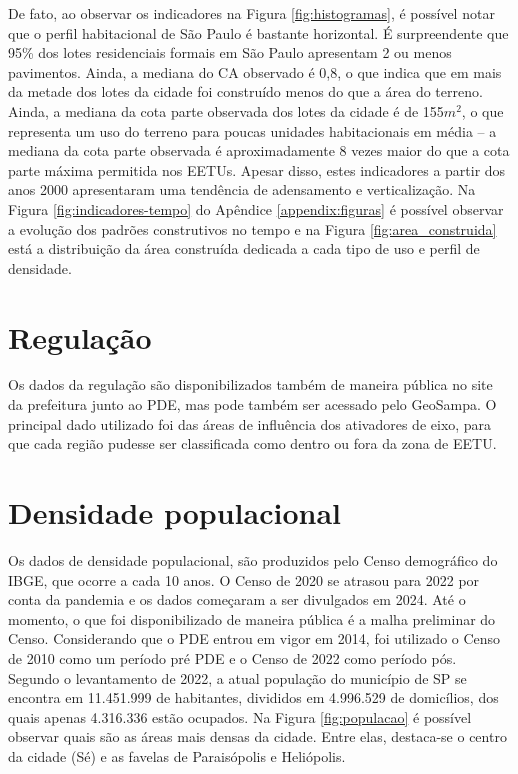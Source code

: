 De fato, ao observar os indicadores na Figura \ref{fig:histogramas}, é possível notar que o perfil habitacional de São Paulo é bastante horizontal. É surpreendente que 95\% dos lotes residenciais formais em São Paulo apresentam 2 ou menos pavimentos. Ainda, a mediana do CA observado é 0,8, o que indica que em mais da metade dos lotes da cidade foi construído menos do que a área do terreno. Ainda, a mediana da cota parte observada dos lotes da cidade é de 155$m^2$, o que representa um uso do terreno para poucas unidades habitacionais em média -- a mediana da cota parte observada é aproximadamente 8 vezes maior do que a cota parte máxima permitida nos EETUs. Apesar disso, estes indicadores a partir dos anos 2000 apresentaram uma tendência de adensamento e verticalização. Na Figura \ref{fig:indicadores-tempo} do Apêndice \ref{appendix:figuras} é possível observar a evolução dos padrões construtivos no tempo e na Figura \ref{fig:area_construida} está a distribuição da área construída dedicada a cada tipo de uso e perfil de densidade.

\section{Regulação}
\label{sec:dadosPDE}

Os dados da regulação são disponibilizados também de maneira pública no site da prefeitura junto ao PDE, mas pode também ser acessado pelo GeoSampa. O principal dado utilizado foi das áreas de influência dos ativadores de eixo, para que cada região pudesse ser classificada como dentro ou fora da zona de EETU.

\section{Densidade populacional}
\label{sec:dadosCenso}

Os dados de densidade populacional, são produzidos pelo Censo demográfico do IBGE, que ocorre a cada 10 anos. O Censo de 2020 se atrasou para 2022 por conta da pandemia e os dados começaram a ser divulgados em 2024. Até o momento, o que foi disponibilizado de maneira pública é a malha preliminar do Censo. Considerando que o PDE entrou em vigor em 2014, foi utilizado o Censo de 2010 como um período pré PDE e o Censo de 2022 como período pós. Segundo o levantamento de 2022, a atual população do município de SP se encontra em 11.451.999 de habitantes, divididos em 4.996.529 de domicílios, dos quais apenas 4.316.336 estão ocupados. Na Figura \ref{fig:populacao} é possível observar quais são as áreas mais densas da cidade. Entre elas, destaca-se o centro da cidade (Sé) e as favelas de Paraisópolis e Heliópolis.

